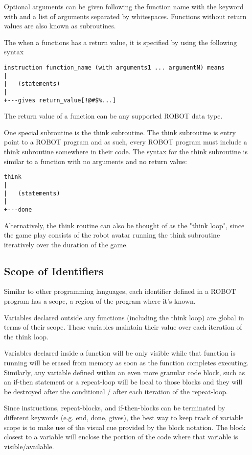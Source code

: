 \documentclass[a4paper]{article}
\begin{document}
Optional arguments can be given following the function name with the keyword with and a list of arguments separated by whitespaces.  Functions without return values are also known as subroutines.

The when a functions has a return value, it is specified by using the following syntax

\begin{verbatim}
instruction function_name (with arguments1 ... argumentN) means
|  
|   (statements)
|
+---gives return_value[!@#$%...]
\end{verbatim}

The return value of a function can be any supported ROBOT data type.

One special subroutine is the think subroutine.  The think subroutine is entry point to a ROBOT program and as such, every ROBOT program must include a think subroutine somewhere in their code.  The syntax for the think subroutine is similar to a function with no arguments and no return value:

\begin{verbatim}
think
|  
|   (statements)
|
+---done
\end{verbatim}

Alternatively, the think routine can also be thought of as the "think loop", since the game play consists of the robot avatar running the think subroutine iteratively over the duration of the game.

\subsection{Scope of Identifiers}

Similar to other programming languages, each identifier defined in a ROBOT program has a scope, a region of the program where it's known.

Variables declared outside any functions (including the think loop) are global in terms of their scope.  These variables maintain their value over each iteration of the think loop.

Variables declared inside a function will be only visible while that function is running will be erased from memory as soon as the function completes executing.  Similarly, any variable defined within an even more granular code block, such as an if-then statement or a repeat-loop will be local to those blocks and they will be destroyed after the conditional / after each iteration of the repeat-loop.

Since instructions, repeat-blocks, and if-then-blocks can be terminated by different keywords (e.g. end, done, gives), the best way to keep track of variable scope is to make use of the visual cue provided by the block notation.  The block closest to a variable will enclose the portion of the code where that variable is visible/available.
\end{document}
